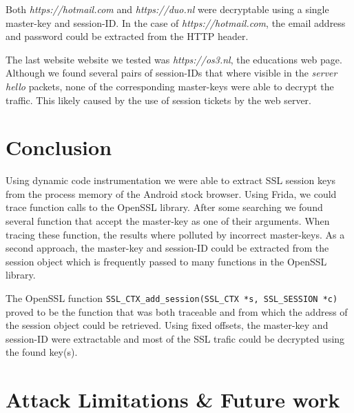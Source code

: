 \documentclass[12pt, a4paper]{report}
\begin{document}
Both \textit{https://hotmail.com} and \textit{https://duo.nl} were decryptable using a single master-key and session-ID. In the case of \textit{https://hotmail.com}, the email address and password could be extracted from the HTTP header. 

The last website website we tested was \textit{https://os3.nl}, the educations web page. Although we found several pairs of session-IDs that where visible in the \textit{server hello} packets, none of the corresponding master-keys were able to decrypt the traffic. This likely caused by the use of session tickets by the web server. 







\chapter{Conclusion}

Using dynamic code instrumentation we were able to extract SSL session keys from the process memory of the Android stock browser. Using Frida, we could trace function calls to the OpenSSL library. After some searching we found several function that accept the master-key as one of their arguments. When tracing these function, the results where polluted by incorrect master-keys. As a second approach, the master-key and session-ID could be extracted from the session object which is frequently passed to many functions in the OpenSSL library. 

The OpenSSL function \texttt{SSL\_CTX\_add\_session(SSL\_CTX *s, SSL\_SESSION *c)} proved to be the function that was both traceable and from which the address of the session object could be retrieved. Using fixed offsets, the master-key and session-ID were extractable and most of the SSL trafic could be decrypted using the found key(s).

   


\chapter{Attack Limitations \& Future work}
\end{document}
